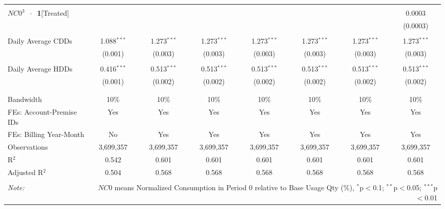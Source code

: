 \begin{table}[!htbp]
\begin{adjustbox}{scale = 0.65}
\begin{tabular}{@{\extracolsep{50pt}}lccccccc}
  & & & & & & & \\ 
 $NC0^{3}$ $\ \cdot \ $ \textbf{1}[Treated] &  &  &  &  &  &  & 0.0003 \\ 
  &  &  &  &  &  &  & (0.0003) \\ 
  & & & & & & & \\ 
 Daily Average CDDs & 1.088$^{***}$ & 1.273$^{***}$ & 1.273$^{***}$ & 1.273$^{***}$ & 1.273$^{***}$ & 1.273$^{***}$ & 1.273$^{***}$ \\ 
  & (0.001) & (0.003) & (0.003) & (0.003) & (0.003) & (0.003) & (0.003) \\ 
  & & & & & & & \\ 
 Daily Average HDDs & 0.416$^{***}$ & 0.513$^{***}$ & 0.513$^{***}$ & 0.513$^{***}$ & 0.513$^{***}$ & 0.513$^{***}$ & 0.513$^{***}$ \\ 
  & (0.001) & (0.002) & (0.002) & (0.002) & (0.002) & (0.002) & (0.002) \\ 
  & & & & & & & \\ 
\hline \\[-1.8ex] 
Bandwidth & 10\% & 10\% & 10\% & 10\% & 10\% & 10\% & 10\% \\ 
FEs: Account-Premise IDs & Yes & Yes & Yes & Yes & Yes & Yes & Yes \\ 
FEs: Billing Year-Month & No & Yes & Yes & Yes & Yes & Yes & Yes \\ 
Observations & 3,699,357 & 3,699,357 & 3,699,357 & 3,699,357 & 3,699,357 & 3,699,357 & 3,699,357 \\ 
R$^{2}$ & 0.542 & 0.601 & 0.601 & 0.601 & 0.601 & 0.601 & 0.601 \\ 
Adjusted R$^{2}$ & 0.504 & 0.568 & 0.568 & 0.568 & 0.568 & 0.568 & 0.568 \\ 
\hline 
\hline \\[-1.8ex] 
\textit{Note:}  & \multicolumn{7}{r}{$NC0$ means Normalized Consumption in Period 0 relative to Base Usage Qty (\%), $^{*}$p$<$0.1; $^{**}$p$<$0.05; $^{***}$p$<$0.01} \\ 
\end{tabular}
\end{adjustbox} 
\end{table} 
